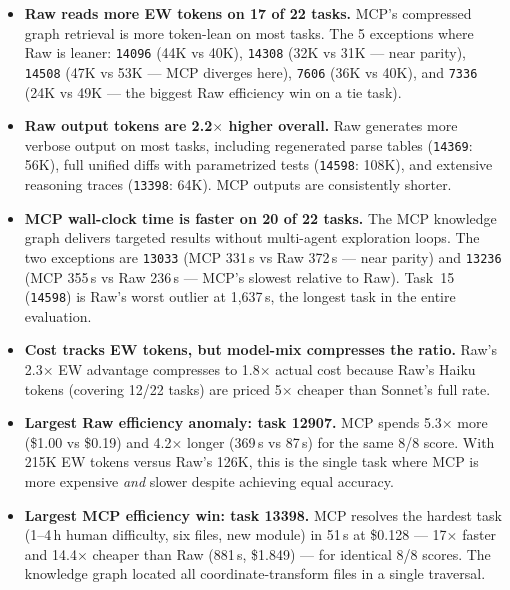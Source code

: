 \begin{itemize}[nosep, leftmargin=*]

\item \textbf{Raw reads more EW tokens on 17 of 22 tasks.}
      MCP's compressed graph retrieval is more token-lean on most tasks.
      The 5 exceptions where Raw is leaner:
      \texttt{14096} (44K vs 40K), \texttt{14308} (32K vs 31K --- near
      parity), \texttt{14508} (47K vs 53K --- MCP diverges here),
      \texttt{7606} (36K vs 40K), and \texttt{7336} (24K vs 49K ---
      the biggest Raw efficiency win on a tie task).

\item \textbf{Raw output tokens are 2.2$\times$ higher overall.}
      Raw generates more verbose output on most tasks, including
      regenerated parse tables (\texttt{14369}: 56K), full unified diffs
      with parametrized tests (\texttt{14598}: 108K), and extensive
      reasoning traces (\texttt{13398}: 64K).
      MCP outputs are consistently shorter.

\item \textbf{MCP wall-clock time is faster on 20 of 22 tasks.}
      The MCP knowledge graph delivers targeted results without
      multi-agent exploration loops.  The two exceptions are
      \texttt{13033} (MCP 331\,s vs Raw 372\,s --- near parity) and
      \texttt{13236} (MCP 355\,s vs Raw 236\,s --- MCP's slowest relative
      to Raw).  Task~15 (\texttt{14598}) is Raw's worst outlier at
      1{,}637\,s, the longest task in the entire evaluation.

\item \textbf{Cost tracks EW tokens, but model-mix compresses the ratio.}
      Raw's 2.3$\times$ EW advantage compresses to 1.8$\times$ actual cost
      because Raw's Haiku tokens (covering 12/22 tasks) are priced
      5$\times$ cheaper than Sonnet's full rate.

\item \textbf{Largest Raw efficiency anomaly: task 12907.}
      MCP spends 5.3$\times$ more (\$1.00 vs \$0.19) and 4.2$\times$ longer
      (369\,s vs 87\,s) for the same 8/8 score.  With 215K EW tokens
      versus Raw's 126K, this is the single task where MCP is more
      expensive \emph{and} slower despite achieving equal accuracy.

\item \textbf{Largest MCP efficiency win: task 13398.}
      MCP resolves the hardest task (1--4\,h human difficulty, six files,
      new module) in 51\,s at \$0.128 --- 17$\times$ faster and
      14.4$\times$ cheaper than Raw (881\,s, \$1.849) --- for identical
      8/8 scores.  The knowledge graph located all coordinate-transform
      files in a single traversal.

\end{itemize}

